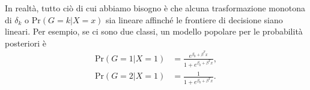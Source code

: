 \documentclass[11pt,openany]{book}
\begin{document}
In realtà, tutto ciò di cui abbiamo bisogno è che alcuna trasformazione monotona di $\delta_k$ o $\text{Pr}(G = k | X = x)$ sia lineare affinché le frontiere di decisione siano lineari. Per esempio, se ci sono due classi, un modello popolare per le probabilità posteriori è
\begin{align}
\text{Pr}(G = 1 | X = 1) & = \frac{e^{\beta_0 + \beta^T x}}{1 + e^{\beta_0 + \beta^T x}},\\
\text{Pr}(G = 2 | X = 1) & = \frac{1}{1 + e^{\beta_0 + \beta^T x}}.
\end{align}

\end{document}
